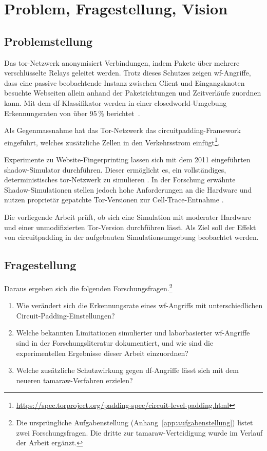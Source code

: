 \chapter{Problem, Fragestellung, Vision}
\label{cha:problem_fragestellung_vision}

\section{Problemstellung}

Das \gls{tor}-Netzwerk anonymisiert Verbindungen, indem Pakete über mehrere verschlüsselte Relays geleitet werden.
Trotz dieses Schutzes zeigen \gls{wf}-Angriffe, dass eine passive beobachtende Instanz zwischen Client und Eingangsknoten besuchte Webseiten allein anhand der Paketrichtungen und Zeitverläufe zuordnen kann.
Mit dem \gls{df}-Klassifikator werden in einer \gls{closedworld}-Umgebung Erkennungsraten von über 95\,\% berichtet~\cite{sirinam2018deep}.

Als Gegenmassnahme hat das Tor-Netzwerk das \gls{circuitpadding}-Framework eingeführt, welches zusätzliche Zellen in den Verkehrsstrom einfügt\footnote{\url{https://spec.torproject.org/padding-spec/circuit-level-padding.html}}.

Experimente zu Website-Fingerprinting lassen sich mit dem 2011 eingeführten \gls{shadow}-Simulator durchführen.
Dieser ermöglicht es, ein vollständiges, deterministisches \gls{tor}-Netzwerk zu simulieren \cite{jansen2011shadow}.
In der Forschung erwähnte Shadow-Simulationen stellen jedoch hohe Anforderungen an die Hardware und nutzen proprietär gepatchte Tor-Versionen zur Cell-Trace-Entnahme \cite{jansen2023data}.

Die vorliegende Arbeit prüft, ob sich eine Simulation mit moderater Hardware und einer unmodifizierten Tor-Version durchführen lässt. Als Ziel soll der Effekt von \gls{circuitpadding} in der aufgebauten Simulationsumgebung beobachtet werden.

\section{Fragestellung}
Daraus ergeben sich die folgenden Forschungsfragen.\footnote{Die ursprüngliche Aufgabenstellung (Anhang~\ref{app:aufgabenstellung}) listet zwei Forschungsfragen. Die dritte zur \gls{tamaraw}-Verteidigung wurde im Verlauf der Arbeit ergänzt.}

\begin{enumerate}
    \item Wie verändert sich die Erkennungsrate eines \gls{wf}-Angriffs mit unterschiedlichen Circuit-Padding-Einstellungen?
    \item Welche bekannten Limitationen simulierter und laborbasierter \gls{wf}-Angriffe sind in der Forschungsliteratur dokumentiert, und wie sind die experimentellen Ergebnisse dieser Arbeit einzuordnen?
    \item Welche zusätzliche Schutzwirkung gegen \gls{df}-Angriffe lässt sich mit dem neueren \gls{tamaraw}-Verfahren erzielen?
\end{enumerate}

